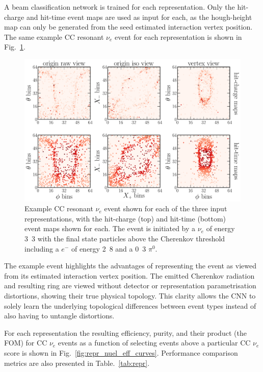 A beam classification network is trained for each representation. Only the hit-charge and hit-time
event maps are used as input for each, as the hough-height map can only be generated from the seed
estimated interaction vertex position. The same example CC resonant $\nu_{e}$ event for each
representation is shown in Fig.~\ref{fig:explore_repr_nuel_ccres_event}.

\begin{figure} %
    \includegraphics[width=\textwidth]{diagrams/7-results/explore_repr_nuel_ccres_event.pdf}
    \caption[Example CC resonant $\nu_{e}$ event shown for different input representations]
    {Example CC resonant $\nu_{e}$ event shown for each of the three input representations, with
        the hit-charge (top) and hit-time (bottom) event maps shown for each. The event is
        initiated by a $\nu_{e}$ of energy \unit{3.3}{\GeV} with the final state particles above
        the Cherenkov threshold including a $e^{-}$ of energy \unit{2.8}{\GeV} and a
        \unit{0.3}{\GeV} $\pi^{0}$.}
    \label{fig:explore_repr_nuel_ccres_event}
\end{figure}

The example event highlights the advantages of representing the event as viewed from its estimated
interaction vertex position. The emitted Cherenkov radiation and resulting ring are viewed without
detector or representation parametrisation distortions, showing their true physical topology. This
clarity allows the CNN to solely learn the underlying topological differences between event types
instead of also having to untangle distortions.

For each representation the resulting efficiency, purity, and their product (the FOM) for CC
$\nu_{e}$ events as a function of selecting events above a particular CC $\nu_{e}$ score is shown
in Fig.~\ref{fig:repr_nuel_eff_curves}. Performance comparison metrics are also presented in
Table.~\ref{tab:repr}.

